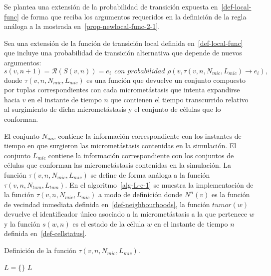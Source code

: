 Se plantea una extensi\'on de la probabilidad de transici\'on expuesta en~\ref{def-local-func} de forma que reciba los argumentos requeridos en la definici\'on de la regla an\'aloga a la mostrada en~\ref{prop-newlocal-func-2-1}. 

\begin{definition}
\label{prop-newlocal-func-5}
Sea una extensi\'on de la funci\'on de transici\'on local definida en~\ref{def-local-func} que incluye una probabilidad de transici\'on alternativa que depende de nuevos argumentos:
\begin{equation}
s(v,n+1) = \mathcal{R}(S(v,n)) = e_i~~\textit{con probabilidad } \rho(v,\tau(v,n,N_{mic},L_{mic}) \rightarrow e_i), \label{eq-newlocal-func-5}
\end{equation}
donde $\tau(v,n,N_{mic},L_{mic})$ es una funci\'on que devuelve un conjunto compuesto por tuplas correspondientes con cada micromet\'astasis que intenta expandirse hacia $v$ en el instante de tiempo $n$ que contienen el tiempo transcurrido relativo al surgimiento de dicha micromet\'astasis y el conjunto de c\'elulas que lo conforman. 
\end{definition}

El conjunto $N_{mic}$ contiene la informaci\'on correspondiente con los instantes de tiempo en que surgieron las micromet\'astasis contenidas en la simulaci\'on. El conjunto $L_{mic}$ contiene la informaci\'on correspondiente con los conjuntos de c\'elulas que conforman las micromet\'astasis contenidas en la simulaci\'on. La funci\'on $\tau(v,n,N_{mic},L_{mic})$ se define de forma an\'aloga a la funci\'on $\tau(v,n,N_{tum},L_{tum})$. En el algoritmo~\ref{alg-L-c-1} se muestra la implementaci\'on de la funci\'on $\tau(v,n,N_{mic},L_{mic})$ a modo de definici\'on donde $N^n(v)$ es la funci\'on de vecindad inmediata definida en~\ref{def-neighbourhoods}, la funci\'on $tumor(w)$ devuelve el identificador \'unico asociado a la micromet\'astasis a la que pertenece $w$ y la funci\'on $s(w,n)$ es el estado de la c\'elula $w$ en el instante de tiempo $n$ definida en~\ref{def-cellstatus}. 

\begin{algorithm}[!ht]
\caption{Definici\'on de la funci\'on $\tau(v,n,N_{mic},L_{mic})$.} \label{alg-L-c-1}
$L = \lbrace \rbrace$\;
\Return $L$\;
\end{algorithm}

